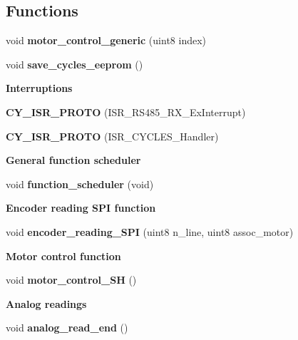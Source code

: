 \subsection*{Functions}
\begin{DoxyCompactItemize}
\item 
void \textbf{ motor\+\_\+control\+\_\+generic} (uint8 index)
\item 
void \textbf{ save\+\_\+cycles\+\_\+eeprom} ()
\end{DoxyCompactItemize}
\begin{Indent}\textbf{ Interruptions}\par
\begin{DoxyCompactItemize}
\item 
\textbf{ C\+Y\+\_\+\+I\+S\+R\+\_\+\+P\+R\+O\+TO} (I\+S\+R\+\_\+\+R\+S485\+\_\+\+R\+X\+\_\+\+Ex\+Interrupt)
\item 
\textbf{ C\+Y\+\_\+\+I\+S\+R\+\_\+\+P\+R\+O\+TO} (I\+S\+R\+\_\+\+C\+Y\+C\+L\+E\+S\+\_\+\+Handler)
\end{DoxyCompactItemize}
\end{Indent}
\begin{Indent}\textbf{ General function scheduler}\par
\begin{DoxyCompactItemize}
\item 
void \textbf{ function\+\_\+scheduler} (void)
\end{DoxyCompactItemize}
\end{Indent}
\begin{Indent}\textbf{ Encoder reading S\+PI function}\par
\begin{DoxyCompactItemize}
\item 
void \textbf{ encoder\+\_\+reading\+\_\+\+S\+PI} (uint8 n\+\_\+line, uint8 assoc\+\_\+motor)
\end{DoxyCompactItemize}
\end{Indent}
\begin{Indent}\textbf{ Motor control function}\par
\begin{DoxyCompactItemize}
\item 
void \textbf{ motor\+\_\+control\+\_\+\+SH} ()
\end{DoxyCompactItemize}
\end{Indent}
\begin{Indent}\textbf{ Analog readings}\par
\begin{DoxyCompactItemize}
\item 
void \textbf{ analog\+\_\+read\+\_\+end} ()
\end{DoxyCompactItemize}
\end{Indent}
